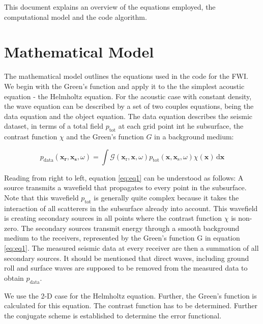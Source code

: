\documentclass[10pt,a4paper]{article}
\newcommand{\df}[1]{\, \ensuremath{\mbox{d}#1}}
\newcommand{\xs}{\mathbf{x}_\text{s}}
\newcommand{\xr}{\mathbf{x}_\text{r}}
\newcommand{\x}{\mathbf{x}}
\begin{document}
This document explains an overview of the equations employed, the computational model and the code algorithm.

\section{Mathematical Model}

The mathematical model outlines the equations used in the code for the FWI. We begin with the Green's function and apply it to the  the simplest acoustic equation - the Helmholtz equation. 
For the acoustic case with constant density, the wave equation can be described by a set of two couples equations, being the data equation and the object equation. The data equation describes the seismic dataset, in terms of a total field $p_{\text{tot}}$ at each grid point int he subsurface, the contrast function $\chi$ and the Green's function $G$ in a background medium:

\begin{equation} \label{eq:eq1}
p_\text{data}(\mathbf{x_\text{r}},\mathbf{x_\text{s}},\omega) = \int \mathcal{G}(\xr, \x, \omega) p_\text{tot}(\x, \xs, \omega) \chi(\x) \df{\x} \end{equation}

Reading from right to left, equation \ref{eq:eq1} can be understood as follows: A source transmits a wavefield that propagates to every point in the subsurface. Note that this wavefield $p_\text{tot}$ is generally quite complex because it takes the interaction of all scatterers in the subsurface already into account. This wavefield is creating secondary sources in all points where the contrast function $\chi$ is non-zero. The secondary sources transmit energy through a smooth background medium to the receivers, represented by the Green's function G in equation \ref{eq:eq1}. \linebreak 
\newline
The measured seismic data at every receiver are then a summation of all secondary sources. It should be mentioned that direct waves, including ground roll and surface waves are supposed to be removed from the measured data to obtain $p_\text{data}$.
\newline

We use the 2-D case for the Helmholtz equation. Further, the Green's function is calculated for this equation. The contrast function has to be determined. Further the conjugate scheme is established to determine the error functional. 
\newline
\end{document}
